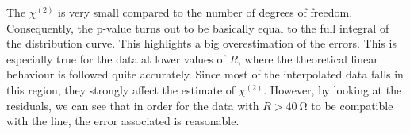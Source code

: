 \documentclass[rmp,10pt,onecolumn,fleqn,notitlepage]{revtex4-1}
\begin{document}
The $\chi^{(2)}$ is very small compared to the number of degrees of freedom. Consequently, the p-value turns out to be basically equal to the full integral of the distribution curve. This highlights a big overestimation of the errors. This is especially true for the data at lower values of $R$, where the theoretical linear behaviour is followed quite accurately. Since most of the interpolated data falls in this region, they strongly affect the estimate of $\chi^{(2)}$. However, by looking at the residuals, we can see that in order for the data with $R>\SI{40}{\ohm}$ to be compatible with the line, the error associated is reasonable.

\begin{figure}[H]
\begin{minipage}[c]{0.49\linewidth}
\end{minipage}
\begin{minipage}[]{0.49\linewidth}
\centering
{}

\end{minipage}
\end{figure}
\end{document}
